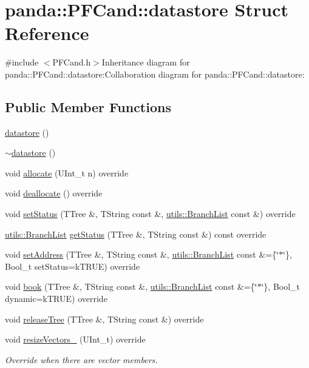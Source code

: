 \hypertarget{structpanda_1_1PFCand_1_1datastore}{
\section{panda::PFCand::datastore Struct Reference}
\label{structpanda_1_1PFCand_1_1datastore}
}


{\ttfamily \#include $<$PFCand.h$>$}Inheritance diagram for panda::PFCand::datastore:Collaboration diagram for panda::PFCand::datastore:\subsection*{Public Member Functions}
\begin{DoxyCompactItemize}
\item 
\hyperlink{structpanda_1_1PFCand_1_1datastore_a43d1760f6d3b403fea68a112cca0b2a7}{datastore} ()
\item 
\hyperlink{structpanda_1_1PFCand_1_1datastore_af62f03093f0dd1177468df953265e198}{$\sim$datastore} ()
\item 
void \hyperlink{structpanda_1_1PFCand_1_1datastore_af5aef7147e657b4f1b4125f3dae0dc39}{allocate} (UInt\_\-t n) override
\item 
void \hyperlink{structpanda_1_1PFCand_1_1datastore_ac7084e2d45811f6909e8c65c20941107}{deallocate} () override
\item 
void \hyperlink{structpanda_1_1PFCand_1_1datastore_a7efac265d60666c7ce27d78adbbf0fbb}{setStatus} (TTree \&, TString const \&, \hyperlink{classpanda_1_1utils_1_1BranchList}{utils::BranchList} const \&) override
\item 
\hyperlink{classpanda_1_1utils_1_1BranchList}{utils::BranchList} \hyperlink{structpanda_1_1PFCand_1_1datastore_a117b3a740a7d57118a35816456118685}{getStatus} (TTree \&, TString const \&) const override
\item 
void \hyperlink{structpanda_1_1PFCand_1_1datastore_a9f79eb8960ad6be9157ed49ec37f4258}{setAddress} (TTree \&, TString const \&, \hyperlink{classpanda_1_1utils_1_1BranchList}{utils::BranchList} const \&=\{\char`\"{}$\ast$\char`\"{}\}, Bool\_\-t setStatus=kTRUE) override
\item 
void \hyperlink{structpanda_1_1PFCand_1_1datastore_a7714d44e5c6b0017ab72d596c83b474b}{book} (TTree \&, TString const \&, \hyperlink{classpanda_1_1utils_1_1BranchList}{utils::BranchList} const \&=\{\char`\"{}$\ast$\char`\"{}\}, Bool\_\-t dynamic=kTRUE) override
\item 
void \hyperlink{structpanda_1_1PFCand_1_1datastore_a9fc7ec497f046c098b89eb04ee508174}{releaseTree} (TTree \&, TString const \&) override
\item 
void \hyperlink{structpanda_1_1PFCand_1_1datastore_a3e3acf6cc81f4ebe16220a7931b3bb2d}{resizeVectors\_\-} (UInt\_\-t) override
\begin{DoxyCompactList}\small\item\em Override when there are vector members. \item\end{DoxyCompactList}\end{DoxyCompactItemize}


